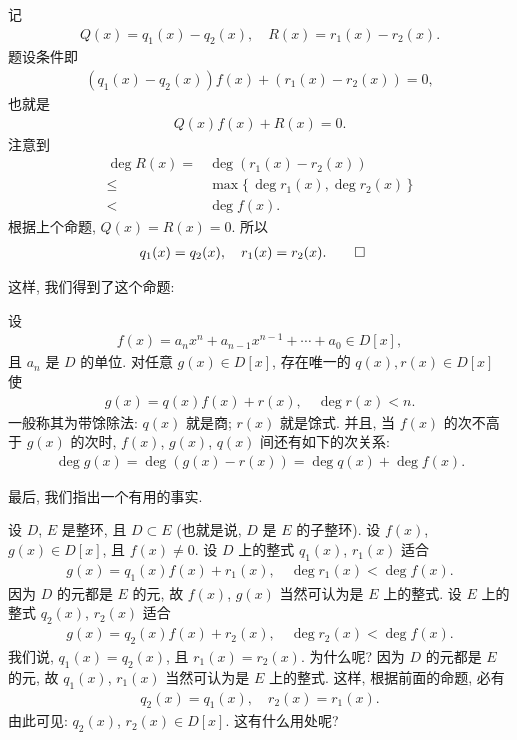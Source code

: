 \begin{pf}
    记
    \begin{align*}
        Q(x) = q_1 (x) - q_2 (x), \quad R(x) = r_1 (x) - r_2 (x).
    \end{align*}
    题设条件即
    \begin{align*}
        (q_1 (x) - q_2 (x)) f(x) + (r_1 (x) - r_2 (x)) = 0,
    \end{align*}
    也就是
    \begin{align*}
        Q(x) f(x) + R(x) = 0.
    \end{align*}
    注意到
    \begin{align*}
        \deg R(x)
        =    {} & \deg {(r_1 (x) - r_2 (x))}                \\
        \leq {} & \max \{\, \deg r_1 (x), \deg r_2 (x) \,\} \\
        <    {} & \deg f(x).
    \end{align*}
    根据上个命题, $Q(x) = R(x) = 0$. 所以
    \begin{align*}
         & q_1 (x) = q_2 (x), \quad r_1 (x) = r_2 (x). \qedhere
    \end{align*}
\end{pf}

这样, 我们得到了这个命题:

\begin{proposition}
    设
    \begin{align*}
        f(x) = a_n x^n + a_{n-1} x^{n-1} + \cdots + a_0 \in D[x],
    \end{align*}
    且 $a_n$ 是 $D$ 的单位. 对任意 $g(x) \in D[x]$, 存在唯一的 $q(x), r(x) \in D[x]$ 使
    \begin{align*}
        g(x) = q(x) f(x) + r(x), \quad \deg r(x) < n.
    \end{align*}
    一般称其为带馀除法: $q(x)$ 就是商; $r(x)$ 就是馀式. 并且, 当 $f(x)$ 的次不高于 $g(x)$ 的次时, $f(x)$, $g(x)$, $q(x)$ 间还有如下的次关系:
    \begin{align*}
        \deg g(x) = \deg {(g(x) - r(x))} = \deg q(x) + \deg f(x).
    \end{align*}
\end{proposition}

最后, 我们指出一个有用的事实.

设 $D$, $E$ 是整环, 且 $D \subset E$ (也就是说, $D$ 是 $E$ 的子整环). 设 $f(x)$, $g(x) \in D[x]$, 且 $f(x) \neq 0$. 设 $D$ 上的整式 $q_1 (x)$, $r_1 (x)$ 适合
\begin{align*}
    g(x) = q_1 (x) f(x) + r_1 (x), \quad \deg r_1 (x) < \deg f(x).
\end{align*}
因为 $D$ 的元都是 $E$ 的元, 故 $f(x)$, $g(x)$ 当然可认为是 $E$ 上的整式. 设 $E$ 上的整式 $q_2 (x)$, $r_2 (x)$ 适合
\begin{align*}
    g(x) = q_2 (x) f(x) + r_2 (x), \quad \deg r_2 (x) < \deg f(x).
\end{align*}
我们说, $q_1 (x) = q_2 (x)$, 且 $r_1 (x) = r_2 (x)$. 为什么呢? 因为 $D$ 的元都是 $E$ 的元, 故 $q_1 (x)$, $r_1 (x)$ 当然可认为是 $E$ 上的整式. 这样, 根据前面的命题, 必有
\begin{align*}
    q_2 (x) = q_1 (x), \quad r_2 (x) = r_1 (x).
\end{align*}
由此可见: $q_2 (x)$, $r_2 (x) \in D[x]$. 这有什么用处呢?

